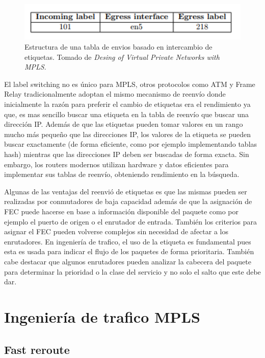 \documentclass[10pt,journal,compsoc]{IEEEtran}
\begin{document}
\begin{figure}[h]
    \center
    \includegraphics[width=15cm]{tabla}
    \caption{Estructura de una tabla de envios basado en intercambio de etiquetas. Tomado de \emph{Desing of Virtual Private Networks with MPLS}\cite{rexford}.}
    \label{fig:tradicitional-architecture}
\end{figure}


El label switching no es único para MPLS, otros protocolos como ATM y Frame Relay tradicionalmente adoptan el mismo mecanismo de reenvío donde inicialmente la razón para preferir el cambio de etiquetas era el rendimiento ya que, es mas sencillo buscar una etiqueta en la tabla de reenvío que buscar una dirección IP.
Además de que las etiquetas pueden tomar valores en un rango mucho más pequeño que las direcciones IP, los valores de la etiqueta se pueden buscar exactamente (de forma eficiente, como por ejemplo implementando tablas hash) mientras que las direcciones IP deben ser buscadas de forma exacta. Sin embargo, los routers modernos utilizan
hardware y datos eficientes para implementar sus tablas de reenvío, obteniendo rendimiento en la búsqueda. 


Algunas de las ventajas del reenvió de etiquetas es que las mismas pueden ser realizadas por conmutadores de baja capacidad además de que la asignación de FEC  puede hacerse en base a información disponible del paquete como  por ejemplo el puerto de origen o el enrutador de entrada. También  los criterios para asignar el FEC pueden volverse complejos sin necesidad de afectar a los enrutadores. En ingeniería de trafico, el uso de la etiqueta es fundamental pues esta es usada para indicar el flujo de los paquetes de forma prioritaria. 
También cabe destacar que algunos enrutadores pueden analizar la cabecera del paquete para determinar la prioridad o la clase del servicio y no solo el salto que este debe dar. 

\section{Ingeniería de trafico MPLS}



\subsection{Fast reroute}
\end{document}
